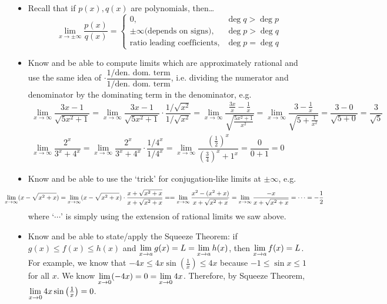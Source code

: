 \documentclass[11pt,letterpaper]{article}
\begin{document}
\begin{itemize}
\item Recall that if $p(x), q(x)$ are polynomials, then\dots
	\[
	\lim_{x \to \pm\infty} \dfrac{p(x)}{q(x)}= 
	\begin{cases}
	0, & \deg q > \deg p \\
	\pm\infty \text{(depends on signs)}, & \deg p > \deg q \\
	\text{ratio leading coefficients}, & \deg p= \deg q
	\end{cases}
	\]

\item Know and be able to compute limits which are approximately rational and use the same idea of $\cdot \dfrac{1/\text{den. dom. term}}{1/\text{den. dom. term}}$, i.e. dividing the numerator and denominator by the dominating term in the denominator, e.g.
	\[
	\begin{gathered}
	\lim_{x \to \infty} \dfrac{3x - 1}{\sqrt{5x^2 + 1}}= \lim_{x \to \infty} \dfrac{3x - 1}{\sqrt{5x^2 + 1}} \cdot \dfrac{1/\sqrt{x^2}}{1/\sqrt{x^2}}= \lim_{x \to \infty} \dfrac{\tfrac{3x}{x} - \tfrac{1}{x}}{\sqrt{\tfrac{5x^2 + 1}{x^2}}}= \lim_{x \to \infty} \dfrac{3 - \tfrac{1}{x}}{\sqrt{5 + \tfrac{1}{x^2}}}= \dfrac{3 - 0}{\sqrt{5 + 0}}= \dfrac{3}{\sqrt{5}} \\
	\lim_{x \to \infty} \dfrac{2^x}{3^x + 4^x}= \lim_{x \to \infty} \dfrac{2^x}{3^x + 4^x} \cdot \dfrac{1/4^x}{1/4^x}= \lim_{x \to \infty} \dfrac{ \left( \tfrac{1}{2} \right)^x}{\left( \tfrac{3}{4} \right)^x + 1^x}= \dfrac{0}{0 + 1}= 0
	\end{gathered}
	\]

\item Know and be able to use the `trick' for conjugation-like limits at $\pm\infty$, e.g. 
	\[
	\hspace{-1.3cm} \lim_{x \to \infty} (x - \sqrt{x^2 + x})= \lim_{x \to \infty} (x - \sqrt{x^2 + x}) \cdot \dfrac{x + \sqrt{x^2 + x}}{x + \sqrt{x^2 + x}}= = \lim_{x \to \infty} \dfrac{x^2 - (x^2 + x)}{x + \sqrt{x^2 + x}}= \lim_{x \to \infty} \dfrac{-x}{x + \sqrt{x^2 + x}}= \cdots= -\dfrac{1}{2}
	\]
where `$\cdots$' is simply using the extension of rational limits we saw above. 

\item Know and be able to state/apply the Squeeze Theorem: if $g(x) \leq f(x) \leq h(x)$ and $\displaystyle\lim_{x \to a} g(x)= L= \lim_{x \to a} h(x)$, then $\displaystyle\lim_{x \to a} f(x)= L$. For example, we know that $-4x \leq 4x \sin \left( \tfrac{1}{x} \right) \leq 4x$ because $-1 \leq \sin x \leq 1$ for all $x$. We know $\displaystyle\lim_{x \to 0} (-4x)= 0= \lim_{x \to 0} 4x$. Therefore, by Squeeze Theorem, $\displaystyle\lim_{x \to 0} 4x \sin \left( \tfrac{1}{x} \right)= 0$. 


\end{itemize}
\end{document}
